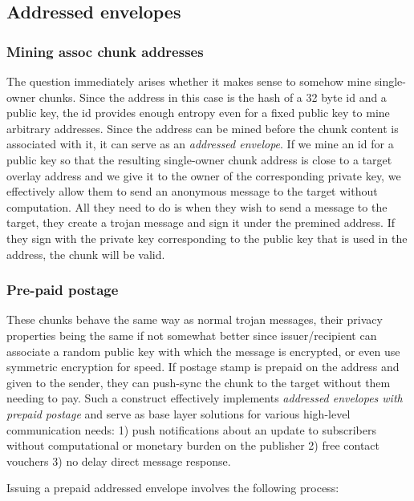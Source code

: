 \subsection{Addressed envelopes}\label{sec:addressed-envelopes}

\subsubsection{Mining assoc chunk addresses}
The question immediately arises whether it makes sense to somehow mine single-owner chunks. Since the address in this case is the hash of a 32 byte id and a public key, the id provides enough entropy even for a fixed public key to mine arbitrary addresses. Since the address can be mined before the chunk content is associated with it, it can serve as an \emph{addressed envelope}. If we mine an id for a public key so that the resulting single-owner chunk address is close to a target overlay address and we give it to the owner of the corresponding private key, we effectively allow them to send an anonymous message to the target without computation. All they need to do is when they wish to send a message to the target, they create a trojan message and sign it under the premined address. If they sign with the private key corresponding to the public key that is used in the address, the chunk will be valid.

\subsubsection{Pre-paid postage}

These chunks behave the same way as normal trojan messages, their privacy properties being the same if not somewhat better since issuer/recipient can associate a random public key with which the message is encrypted,  or even use symmetric encryption for speed. If postage stamp is prepaid on the address and given to the sender, they can push-sync the chunk to the target without them needing to pay. Such a construct effectively implements \emph{addressed envelopes with prepaid postage} and serve as base layer solutions for various high-level communication needs: 1) push notifications about an update to subscribers without computational or monetary burden on the publisher 2) free contact vouchers 3) no delay direct message response.  

Issuing a prepaid addressed envelope involves the following process:

